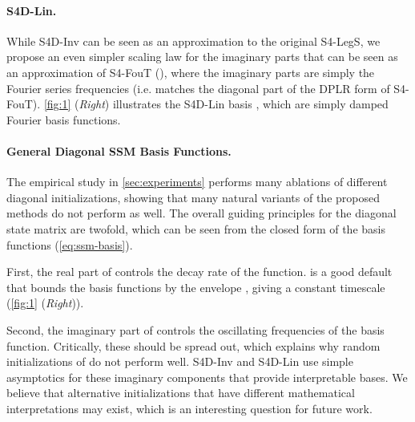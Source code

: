 \documentclass{article}
\newcommand{\para}[1]{\paragraph{#1}}
\begin{document}
\begin{minipage}{.6\linewidth}\noindent
  
\end{minipage}\begin{minipage}{.4\linewidth}
\end{minipage}

\para{S4D-Lin.}
While S4D-Inv can be seen as an approximation to the original S4-LegS, we propose an even simpler scaling law for the imaginary parts that can be seen as an approximation of S4-FouT (\citep{gu2022hippo}),
where the imaginary parts are simply the Fourier series frequencies (i.e. matches the diagonal part of the DPLR form of S4-FouT).
\cref{fig:1} (\emph{Right}) illustrates the S4D-Lin basis , which are simply damped Fourier basis functions.

\para{General Diagonal SSM Basis Functions.}
The empirical study in \cref{sec:experiments} performs many ablations of different diagonal initializations, showing that many natural variants of the proposed methods do not perform as well.
The overall guiding principles for the diagonal state matrix  are twofold, which can be seen from the closed form of the basis functions  (\cref{eq:ssm-basis}).

First, the real part of  controls the decay rate of the function.
 is a good default that bounds the basis functions by the envelope , giving a constant timescale (\cref{fig:1} (\emph{Right})).

Second, the imaginary part of  controls the oscillating frequencies of the basis function.
Critically, these should be spread out, which explains why random initializations of  do not perform well.
S4D-Inv and S4D-Lin use simple asymptotics for these imaginary components that provide interpretable bases.
We believe that alternative initializations that have different mathematical interpretations may exist, which is an interesting question for future work.
\end{document}
